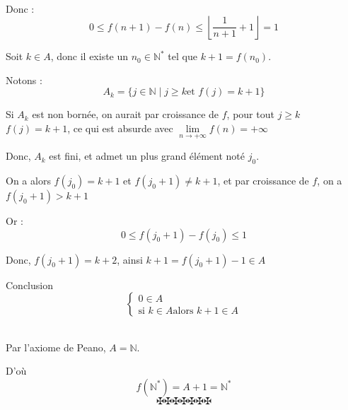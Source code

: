 \

Donc :
\[ 0 \leqslant f (n + 1) - f (n) \leqslant \left\lfloor \frac{1}{n + 1} + 1
   \right\rfloor = 1 \]


Soit $k \in A$, donc il existe un $n_0 \in \mathbb{N}^{\ast}$ tel que $k + 1 =
f (n_0)$.

Notons :
\[ A_k =\{j \in \mathbb{N} \mid j \geqslant k \text{et } f (j) = k + 1\} \]


Si $A_k$ est non born{\'e}e, on aurait par croissance de $f$, pour tout $j
\geqslant k$ $f (j) = k + 1$, ce qui est absurde avec $\underset{n \to +
\infty}{\lim} f (n) = + \infty$

Donc, $A_k$ est fini, et admet un plus grand {\'e}l{\'e}ment not{\'e} $j_0$.

On a alors $f (j_0) = k + 1$ et $f (j_0 + 1) \neq k + 1$, et par croissance de
$f$, on a $f (j_0 + 1) > k + 1$

Or :
\[ 0 \leqslant f (j_0 + 1) - f (j_0) \leqslant 1 \]


Donc, $f (j_0 + 1) = k + 2$, ainsi $k + 1 = f (j_0 + 1) - 1 \in A$

Conclusion
\[ \left\{\begin{array}{l}
     0 \in A\\
     \text{si } k \in A \text{alors } k + 1 \in A
   \end{array}\right. \]
\

Par l'axiome de Peano, $A =\mathbb{N}$.

D'o{\`u}
\[ f (\mathbb{N}^{\ast}) = A + 1 =\mathbb{N}^{\ast} \]
\[ \maltese \maltese \maltese \maltese \maltese \maltese \maltese \]
